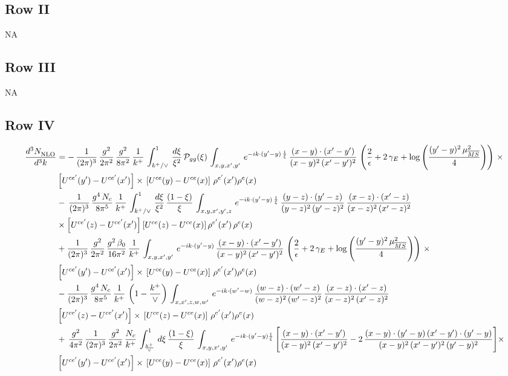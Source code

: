 \documentclass[9pt]{article}
\numberwithin{equation}{section}
\begin{document}
\subsection{Row II}
\textsc{NA}
\subsection{Row III}
\textsc{NA}
\subsection{Row IV}
\begin{align}
    \frac{d^{3}N_{\rm NLO}^{\rm}}{d^{3}k}  & =  
    -\,\frac{1}{(2\pi)^{3}}\,\frac{g^{2}}{2\pi^{2}}\,\frac{g^{2}}{8\pi^{2}}\,\frac{1}{k^{+}}\,\int_{k^{+}/\vee}^{1}\, \frac{d\xi}{\xi^{2}}\,\mathcal{P}_{gg}(\xi)\,\int_{x,y,x',y'}\, e^{-ik\cdot (y'-y)\,\frac{1}{\xi}}\, \frac{(x-y)\cdot (x'-y')}{(x-y)^{2}\,(x'-y')^{2}}\,\left(\frac{2}{\epsilon}+2\,\gamma_{E}+\log{\left(\frac{(y'-y)^{2}\,\mu^{2}_{\overline{MS}}}{4}\right)}\right)\,\times\notag \\ &  \left[U^{ce'}(y') - U^{ce'}(x')\right] \times\, \left[U^{ce}(y) - U^{ce}(x)\right]\, \rho^{e'}(x') \rho^{e}(x) 
    \notag \\ & -\,\frac{1}{(2\pi)^{3}}\,\frac{g^{4}\,N_{c}}{8\pi^{5}}\, \frac{1}{k^{+}}\,\int_{k^{+}/\vee}^{1}\,\frac{d\xi}{\xi^{2}}\,\frac{(1-\xi)}{\xi}\,\int_{x,y,x',y',z}\, e^{-ik\cdot (y'-y)\,\frac{1}{\xi}}\,\frac{(y-z)\cdot (y'-z)}{(y-z)^{2}\,(y'-z)^{2}}\,\frac{(x-z)\cdot (x'-z)}{(x-z)^{2}\,(x'-z)^{2}}\notag\\
&\times\left[U^{ce'}(z) - U^{ce'}(x')\right]\left[U^{ce}(z) - U^{ce}(x)\right]\rho^{e'}(x')\,\rho^{e}(x) \notag \\ & +\frac{1}{(2\pi)^{3}}\, \frac{g^{2}}{2\pi^{2}}\,\frac{g^{2}\,\beta_{0}}{16\pi^{2}}\, \frac{1}{k^{+}}\,\int_{x,y,x',y'}\, e^{-ik\cdot (y'-y)}\, \frac{(x-y)\cdot (x'-y')}{(x-y)^{2}\,(x'-y')^{2}}\,\left(\frac{2}{\epsilon}+2\,\gamma_{E}+\log{\left(\frac{(y'-y)^{2}\,\mu^{2}_{\overline{MS}}}{4}\right)}\right)\,\times\notag \\ &  \left[U^{ce'}(y') - U^{ce'}(x')\right] \times\, \left[U^{ce}(y) - U^{ce}(x)\right]\, \rho^{e'}(x') \rho^{e}(x)\notag \\ &
    -\frac{1}{(2\pi)^{3}}\,\frac{g^{4}\,N_{c}}{8\pi^{5}}\,\frac{1}{k^{+}}\,\left(1-\frac{k^{+}}{\vee}\right)\,\int_{x,x',z,w,w'}\,e^{-ik\cdot (w'-w)}\,\frac{(w-z)\cdot(w'-z)}{(w-z)^{2}\,(w'-z)^{2}}\,\frac{(x-z)\cdot(x'-z)}{(x-z)^{2}\,(x'-z)^{2}}\notag \\
& \left[U^{ce'}(z) - U^{ce'}(x')\right] \times\, \left[U^{ce}(z) - U^{ce}(x)\right]\, \rho^{e'}(x') \rho^{e}(x) \notag \\
&  +\,\frac{g^{2}}{4\pi^{2}}\, \frac{1}{(2\pi)^{3}}\,\frac{g^{2}}{2\pi^{2}}\, \frac{N_{c}}{k^{+}}\,\int_{\frac{k^{+}}{\vee}}^{1}\,d\xi\, \frac{(1-\xi)}{\xi}\, \int_{x,y,x',y'}\,e^{-ik\cdot (y'-y)\frac{1}{\xi}}\,\Bigg[\frac{(x-y)\cdot (x'-y')}{(x-y)^{2}\, (x'-y')^{2}} -2\,\frac{(x-y)\cdot (y'-y)\, (x'-y')\cdot (y'-y)}{(x-y)^{2}\,(x'-y')^{2}\,(y'-y)^{2}}\Bigg]\times\notag \\ &  \left[U^{ce'}(y') - U^{ce'}(x')\right] \times\, \left[U^{ce}(y) - U^{ce}(x)\right]\, \rho^{e'}(x') \rho^{e}(x)
\end{align}
\end{document}
